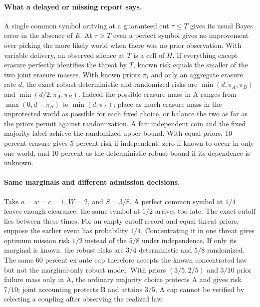 \documentclass[11pt]{article}
\begin{document}
\paragraph{What a delayed or missing report says.}
A single common symbol arriving at a guaranteed cut $\tau\le T$ gives its usual Bayes error in the absence of $E$. At $\tau>T$ even a perfect symbol gives no improvement over picking the more likely world when there was no prior observation. With variable delivery, an observed silence at $T$ is a cell of $H$. If everything except erasure perfectly identifies the threat by $T$, known risk equals the smaller of the two joint erasure masses. With known priors $\pi_i$ and only an aggregate erasure rate $d$, the exact robust deterministic and randomized risks are $\min(d,\pi_A,\pi_B)$ and $\min(d/2,\pi_A,\pi_B)$. Indeed the possible erasure mass in A ranges from $\max(0,d-\pi_B)$ to $\min(d,\pi_A)$; place as much erasure mass in the unprotected world as possible for each fixed choice, or balance the two as far as the priors permit against randomization. A fair independent coin and the fixed majority label achieve the randomized upper bound. With equal priors, 10 percent erasure gives 5 percent risk if independent, zero if known to occur in only one world, and 10 percent as the deterministic robust bound if its dependence is unknown.

\paragraph{Same marginals and different admission decisions.}
Take $a=w=c=1$, $W=2$, and $S=3/8$. A perfect common symbol at $1/4$ leaves enough clearance; the same symbol at $1/2$ arrives too late. The exact cutoff lies between these times. For an empty cutoff record and equal threat priors, suppose the earlier event has probability $1/4$. Concentrating it in one threat gives optimum mission risk $1/2$ instead of the $5/8$ under independence. If only its marginal is known, the robust risks are $3/4$ deterministic and $5/8$ randomized. The same 60 percent ex ante cap therefore accepts the known concentrated law but not the marginal-only robust model. With priors $(3/5,2/5)$ and $3/10$ prior failure mass only in A, the ordinary majority choice protects A and gives risk $7/10$; joint accounting protects B and attains $3/5$. A cap cannot be verified by selecting a coupling after observing the realized law.
\end{document}
